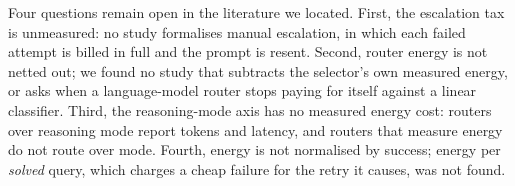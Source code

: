 Four questions remain open in the literature we located. First, the
escalation tax is unmeasured: no study formalises manual escalation, in which
each failed attempt is billed in full and the prompt is resent. Second,
router energy is not netted out; we found no study that subtracts the
selector's own measured energy, or asks when a language-model router stops
paying for itself against a linear classifier. Third, the reasoning-mode axis
has no measured energy cost: routers over reasoning mode report tokens and
latency, and routers that measure energy do not route over mode. Fourth,
energy is not normalised by success; energy per \emph{solved} query, which
charges a cheap failure for the retry it causes, was not found.
